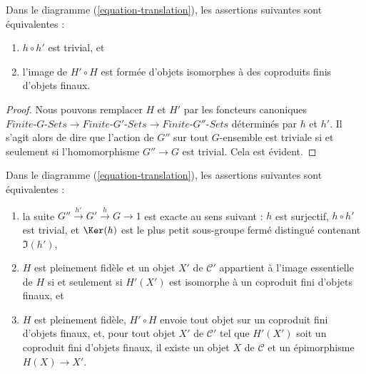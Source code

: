 \begin{lemma}
\label{lemma-composition-trivial}
Dans le diagramme (\ref{equation-translation}), les assertions suivantes sont équivalentes :
\begin{enumerate}
\item $h \circ h'$ est trivial, et
\item l'image de $H' \circ H$ est formée d'objets isomorphes à des coproduits
finis d'objets finaux.
\end{enumerate}
\end{lemma}

\begin{proof}
Nous pouvons remplacer $H$ et $H'$ par les foncteurs canoniques
$\textit{Finite-}G\textit{-Sets} \to \textit{Finite-}G'\textit{-Sets}
\to \textit{Finite-}G''\textit{-Sets}$ déterminés par $h$ et $h'$.
Il s'agit alors de dire que l'action de $G''$ sur tout $G$-ensemble est triviale
si et seulement si l'homomorphisme $G'' \to G$ est trivial. Cela est évident.
\end{proof}

\begin{lemma}
\label{lemma-functoriality-galois-ses}
Dans le diagramme (\ref{equation-translation}), les assertions suivantes sont équivalentes :
\begin{enumerate}
\item la suite $G'' \xrightarrow{h'} G' \xrightarrow{h} G \to 1$
est exacte au sens suivant : $h$ est surjectif, $h \circ h'$ est trivial,
et $\Ker(h)$ est le plus petit sous-groupe fermé distingué contenant $\Im(h')$,
\item $H$ est pleinement fidèle et un objet $X'$ de $\mathcal{C}'$ appartient à
l'image essentielle de $H$ si et seulement si $H'(X')$ est isomorphe à un
coproduit fini d'objets finaux, et
\item $H$ est pleinement fidèle, $H' \circ H$ envoie tout objet sur un coproduit
fini d'objets finaux, et, pour tout objet $X'$ de $\mathcal{C}'$
tel que $H'(X')$ soit un coproduit fini d'objets finaux, il existe
un objet $X$ de $\mathcal{C}$ et un épimorphisme $H(X) \to X'$.
\end{enumerate}
\end{lemma}

